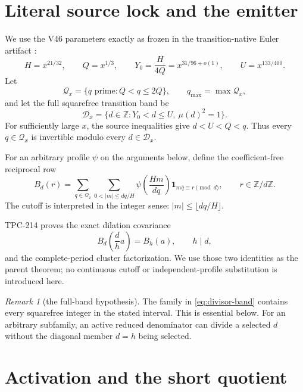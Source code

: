 \documentclass[11pt]{article}
\theoremstyle{definition}
\theoremstyle{remark}
\newtheorem{remark}[theorem]{Remark}
\newcommand{\ZZ}{\mathbb Z}
\newcommand{\one}{\mathbf 1}
\newcommand{\Dd}{\mathcal D}
\newcommand{\QQ}{\mathcal Q}
\begin{document}
\section{Literal source lock and the emitter}

We use the V46 parameters exactly as frozen in the transition-native Euler
artifact \cite{WangV46}:
\begin{equation}
 H=x^{21/32},\qquad Q=x^{1/3},\qquad
 Y_0=\frac{H}{4Q}=x^{31/96+o(1)},\qquad
 U=x^{133/400}.
 \label{eq:scales}
\end{equation}
Let
\begin{equation}
 \QQ_x=\{q\text{ prime}:Q<q\le2Q\},
 \qquad q_{\max}=\max\QQ_x,
 \label{eq:prime-shell}
\end{equation}
and let the full squarefree transition band be
\begin{equation}
 \Dd_x=\{d\in\ZZ:Y_0<d\le U,\ \mu(d)^2=1\}.
 \label{eq:divisor-band}
\end{equation}
For sufficiently large $x$, the source inequalities give $d<U<Q<q$.  Thus
every $q\in\QQ_x$ is invertible modulo every $d\in\Dd_x$.

For an arbitrary profile $\psi$ on the arguments below, define the
coefficient-free reciprocal row
\begin{equation}
 B_d(r)=\sum_{q\in\QQ_x}
 \sum_{0<|m|\le dq/H}
 \psi\!\left(\frac{Hm}{dq}\right)
 \one_{m\overline q\equiv r\pmod d},
 \qquad r\in\ZZ/d\ZZ.
 \label{eq:emitter}
\end{equation}
The cutoff is interpreted in the integer sense:
\(|m|\le\lfloor dq/H\rfloor\).

TPC-214 proves the exact dilation covariance
\begin{equation}
 B_d\!\left(\frac dh a\right)=B_h(a),
 \qquad h\mid d,
 \label{eq:dilation}
\end{equation}
and the complete-period cluster factorization.  We use those two identities
as the parent theorem; no continuous cutoff or independent-profile
substitution is introduced here.

\begin{remark}[the full-band hypothesis]
The family in \eqref{eq:divisor-band} contains every squarefree integer in the
stated interval.  This is essential below.  For an arbitrary subfamily, an
active reduced denominator can divide a selected $d$ without the diagonal
member $d=h$ being selected.
\end{remark}

\section{Activation and the short quotient}
\end{document}

